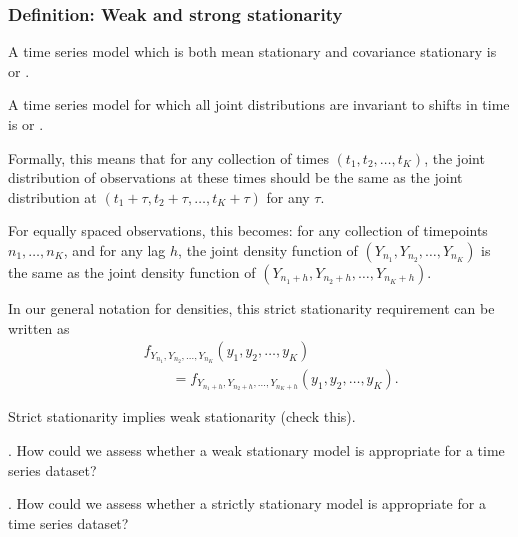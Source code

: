 \begin{frame}[fragile]
\frametitle{Definition: Weak and strong stationarity}

\bi

\item A time series model which is both mean stationary and covariance stationary is  or .

\item A time series model for which all joint distributions are invariant to shifts in time is  or .

\item Formally, this means that for any collection of times $(t_1, t_2,\dots,t_K)$, the joint distribution of observations at these times should be the same as the joint distribution at $(t_1+\tau, t_2+\tau,\dots,t_K+\tau)$ for any $\tau$.

\item For equally spaced observations, this becomes: for any collection of timepoints $n_1,\dots,n_K$, and for any lag $h$, the joint density function of $(Y_{n_1},Y_{n_2},\dots, Y_{n_K})$ is the same as the joint density function of $(Y_{n_1+h},Y_{n_2+h},\dots, Y_{n_K+h})$.

\ei

\end{frame}

\begin{frame}[fragile]

\bi
\item In our general notation for densities, this strict stationarity requirement can be written as
\begin{eqnarray}&&f_{Y_{n_1},Y_{n_2},\dots, Y_{n_K}}(y_1,y_2,\dots,y_K)\\
&&\quad\quad = f_{Y_{n_1+h},Y_{n_2+h},\dots, Y_{n_K+h}}(y_1,y_2,\dots,y_K).
\end{eqnarray}

\item Strict stationarity implies weak stationarity (check this). 

\ei

\myquestion. How could we assess whether a weak stationary model is appropriate for a time series dataset?


\end{frame}
\begin{frame}

\myquestion. How could we assess whether a strictly stationary model is appropriate for a time series dataset?

\answer{\vspace{40mm}}

\end{frame} 

